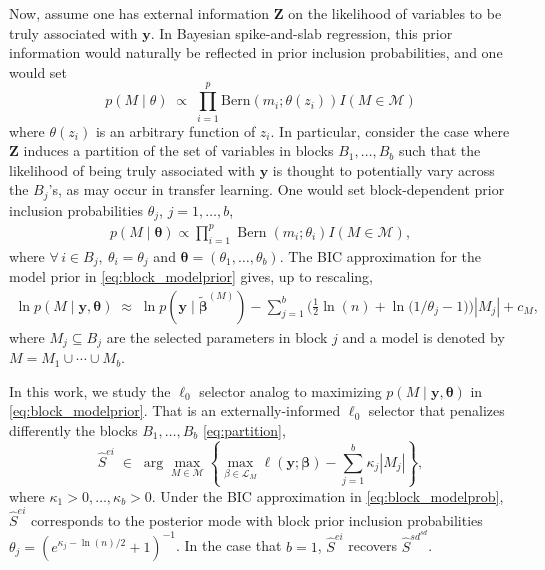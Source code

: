 \documentclass[
  12pt]{article}
\newcommand{\M}{\mathcal{M}}
\newcommand{\by}{\mathbf{y}}
\newcommand{\bbeta}{\boldsymbol{\beta}}
\newcommand{\btheta}{\boldsymbol{\theta}}
\newcommand{\bZ}{\boldsymbol{Z}}
\begin{document}
Now, assume one has external information $\bZ$ on the likelihood of variables to be truly associated with $\by$. In Bayesian spike-and-slab regression, this prior information would naturally be reflected in prior inclusion probabilities, and one would set
\begin{equation}\label{eq:avfob}
     p(M  \mid \theta)\;\propto\;\prod_{i=1}^p \mbox{Bern}(m_i; \theta(z_i))I(M \in \M)
\end{equation}
where $\theta(z_i)$ is an arbitrary function of $z_i$. In particular, consider the case where $\bZ$
induces a partition of the set of variables in blocks $B_1,\ldots,B_b$ such that the likelihood of being truly associated with $\by$ is thought to potentially vary across the $B_j$'s, as may occur in transfer learning. One would set block-dependent prior inclusion probabilities $\theta_j$, $j=1,\ldots,b$,
\begin{eqnarray} \label{eq:block_modelprior}
p( M \mid \btheta) \propto
        \prod_{i=1}^p \operatorname{Bern}\left(m_i ; \theta_i\right) I(M \in \M),
\end{eqnarray}
where $\forall \, i\in B_j, \: \theta_i=\theta_j$ and $\btheta=(\theta_1,\ldots,\theta_b)$. The BIC approximation for the model prior in \eqref{eq:block_modelprior} gives, up to rescaling,
\begin{eqnarray}\label{eq:block_modelprob}
\ln p(M \mid\by, \mathbf{\theta}) \;\approx\; \ln p(\by \mid \tilde{\bbeta}^{(M)}) - \sum_{j=1}^b\Big(\frac{1}{2}\ln(n) +\ln \big(1/\theta_j-1\big)\Big)|M_j| + c_M,
\end{eqnarray}
where $M_j \subseteq B_j$ are
the selected parameters in block $j$ and a model is denoted by $M=M_1\cup\cdots\cup M_b$.

In this work, we study the $\ell_0$ selector analog to maximizing $p(M \mid \by, \mathbf{\theta})$ in \eqref{eq:block_modelprior}. That is an externally-informed $\ell_0$ selector that penalizes differently the blocks $B_1,\ldots,B_b$ \eqref{eq:partition},
\begin{equation}\label{eq:Mhat}
  \hat S^{ei}\;\in\;\arg\max_{M\in \M} \left\{\max_{\beta\in \mathcal{L}_M}\ell(\by; \bbeta)-\sum_{j=1}^b\kappa_j |M_j| \right\},
\end{equation}
where $\kappa_1>0,\ldots,\kappa_b>0$. Under the BIC approximation in \eqref{eq:block_modelprob}, $\hat S^{ei}$ corresponds to the posterior mode with block prior inclusion probabilities $\theta_j=(e^{\kappa_j-\ln(n)/2}+1)^{-1}$. In the case that $b=1$, $\hat S^{ei}$ recovers $\hat{S}^{sd}^{sd}$.
\end{document}
